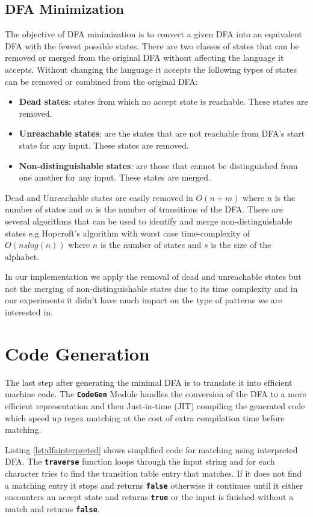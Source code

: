 \subsection{DFA Minimization}
The objective of DFA minimization is to convert a given DFA into an equivalent DFA with the fewest possible states. There are two classes of states that can be removed or merged from the original DFA without affecting the language it accepts. Without changing the language it accepts the following types of states can be removed or combined from the original DFA:
\begin{itemize}
    \item \textbf{Dead states}: states from which no accept state is reachable. These states are removed.
    \item  \textbf{Unreachable states}: are the states that are not reachable from DFA's start state for any input. These states are removed.
    \item \textbf{Non-distinguishable states}: are those that cannot be distinguished from one another for any input. These states are merged.
\end{itemize}

Dead and Unreachable states are easily removed in $O(n + m)$ where $n$ is the number of states and $m$ is the number of transitions of the DFA. There are several algorithms that can be used to identify and merge non-distinguishable states e.g Hopcroft's algorithm \cite{Hopcroftalgo} with worst case time-complexity of $O(ns log(n))$ where $n$ is the number of states and $s$ is the size of the alphabet.

In our implementation we apply the removal of dead and unreachable states but not the merging of non-distinguishable states due to its time complexity and in our experiments it didn't have much impact on the type of patterns we are interested in.

\section{Code Generation}
The last step after generating the minimal DFA is to translate it into efficient machine code. The \texttt{\textbf{CodeGen}} Module handles the conversion of the DFA to a more efficient representation and then Just-in-time (JIT) compiling the generated code which speed up regex matching at the cost of extra compilation time before matching.

Listing \ref{lst:dfainterpreted} shows simplified code for matching using interpreted DFA. The \texttt{\textbf{traverse}} function loops through the input string and for each character tries to find the transition table entry that matches. If it does not find a matching entry it stops and returns \texttt{\textbf{false}} otherwise it continues until it either encounters an accept state and returns \texttt{\textbf{true}} or the input is finished without a match and returns \texttt{\textbf{false}}.

